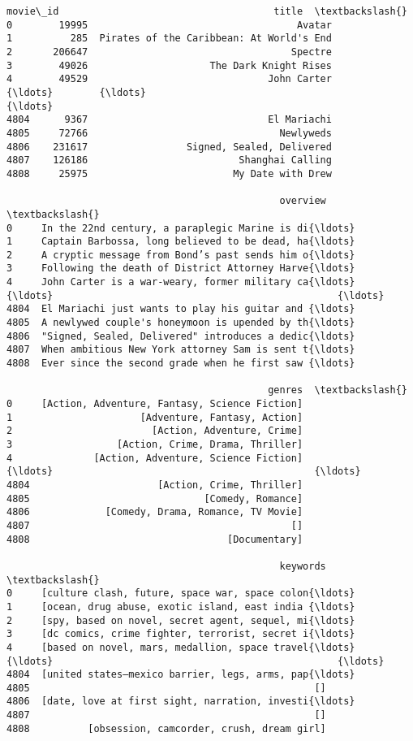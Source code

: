 \documentclass[11pt]{article}
\makeatletter
\newcommand{\boxspacing}{\kern\kvtcb@left@rule\kern\kvtcb@boxsep}
\newcommand{\prompt}[4]{
        {\ttfamily\llap{{\color{#2}[#3]:\hspace{3pt}#4}}\vspace{-\baselineskip}}
    }
\makeatother
\begin{document}
            \begin{tcolorbox}[breakable, size=fbox, boxrule=.5pt, pad at break*=1mm, opacityfill=0]
\prompt{Out}{outcolor}{48}{\boxspacing}
\begin{Verbatim}[commandchars=\\\{\}]
      movie\_id                                     title  \textbackslash{}
0        19995                                    Avatar
1          285  Pirates of the Caribbean: At World's End
2       206647                                   Spectre
3        49026                     The Dark Knight Rises
4        49529                               John Carter
{\ldots}        {\ldots}                                       {\ldots}
4804      9367                               El Mariachi
4805     72766                                 Newlyweds
4806    231617                 Signed, Sealed, Delivered
4807    126186                          Shanghai Calling
4808     25975                         My Date with Drew

                                               overview  \textbackslash{}
0     In the 22nd century, a paraplegic Marine is di{\ldots}
1     Captain Barbossa, long believed to be dead, ha{\ldots}
2     A cryptic message from Bond’s past sends him o{\ldots}
3     Following the death of District Attorney Harve{\ldots}
4     John Carter is a war-weary, former military ca{\ldots}
{\ldots}                                                 {\ldots}
4804  El Mariachi just wants to play his guitar and {\ldots}
4805  A newlywed couple's honeymoon is upended by th{\ldots}
4806  "Signed, Sealed, Delivered" introduces a dedic{\ldots}
4807  When ambitious New York attorney Sam is sent t{\ldots}
4808  Ever since the second grade when he first saw {\ldots}

                                             genres  \textbackslash{}
0     [Action, Adventure, Fantasy, Science Fiction]
1                      [Adventure, Fantasy, Action]
2                        [Action, Adventure, Crime]
3                  [Action, Crime, Drama, Thriller]
4              [Action, Adventure, Science Fiction]
{\ldots}                                             {\ldots}
4804                      [Action, Crime, Thriller]
4805                              [Comedy, Romance]
4806             [Comedy, Drama, Romance, TV Movie]
4807                                             []
4808                                  [Documentary]

                                               keywords  \textbackslash{}
0     [culture clash, future, space war, space colon{\ldots}
1     [ocean, drug abuse, exotic island, east india {\ldots}
2     [spy, based on novel, secret agent, sequel, mi{\ldots}
3     [dc comics, crime fighter, terrorist, secret i{\ldots}
4     [based on novel, mars, medallion, space travel{\ldots}
{\ldots}                                                 {\ldots}
4804  [united states–mexico barrier, legs, arms, pap{\ldots}
4805                                                 []
4806  [date, love at first sight, narration, investi{\ldots}
4807                                                 []
4808          [obsession, camcorder, crush, dream girl]


\end{Verbatim}
\end{tcolorbox}
\end{document}
